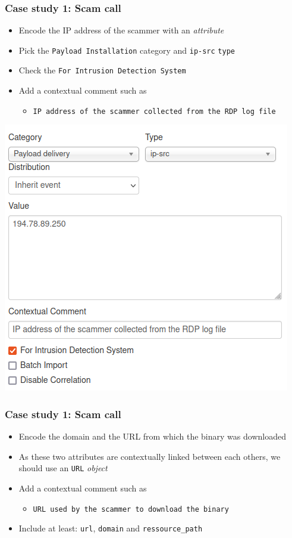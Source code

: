 \begin{frame}
    \frametitle{Case study 1: Scam call}
    \begin{itemize}
        \item Encode the IP address of the scammer with an \textit{attribute}
        \item Pick the \texttt{Payload Installation} category and \texttt{ip-src}  \texttt{type}
        \item Check the \texttt{For Intrusion Detection System}
        \item Add a contextual comment such as
        \begin{itemize}
            \item \texttt{IP address of the scammer collected from the RDP log file}
        \end{itemize}
    \end{itemize}
    \begin{center}
        \includegraphics[width=0.63\linewidth]{pictures/case1/attribute-ip.png}
    \end{center}
\end{frame}

\begin{frame}
    \frametitle{Case study 1: Scam call}
    \begin{itemize}
        \item Encode the domain and the URL from which the binary was downloaded
        \item As these two attributes are contextually linked between each others, we should use an \texttt{URL} \textit{object}
        \item Add a contextual comment such as
        \begin{itemize}
            \item \texttt{URL used by the scammer to download the binary}
        \end{itemize}
        \item Include at least: \texttt{url}, \texttt{domain} and \texttt{ressource\_path}
    \end{itemize}
\end{frame}

